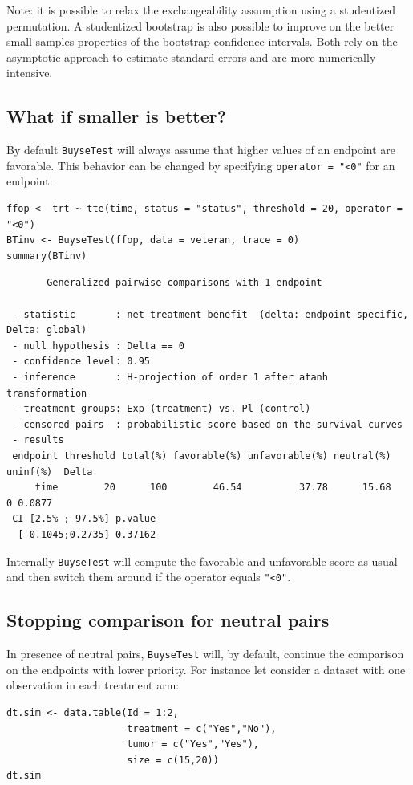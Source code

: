 \documentclass[12pt]{article}
\begin{document}
\bigskip

Note: it is possible to relax the exchangeability assumption using a
studentized permutation. A studentized bootstrap is also possible to
improve on the better small samples properties of the bootstrap
confidence intervals. Both rely on the asymptotic approach to estimate
standard errors and are more numerically intensive.

\clearpage

\subsection{What if smaller is better?}
\label{sec:org370f184}
By default \texttt{BuyseTest} will always assume that higher values of an
endpoint are favorable. This behavior can be changed by specifying \texttt{operator = "<0"}
for an endpoint:
\lstset{language=r,label= ,caption= ,captionpos=b,numbers=none}
\begin{lstlisting}
ffop <- trt ~ tte(time, status = "status", threshold = 20, operator = "<0")
BTinv <- BuyseTest(ffop, data = veteran, trace = 0)
summary(BTinv)
\end{lstlisting}

\begin{verbatim}
       Generalized pairwise comparisons with 1 endpoint

 - statistic       : net treatment benefit  (delta: endpoint specific, Delta: global) 
 - null hypothesis : Delta == 0 
 - confidence level: 0.95 
 - inference       : H-projection of order 1 after atanh transformation 
 - treatment groups: Exp (treatment) vs. Pl (control) 
 - censored pairs  : probabilistic score based on the survival curves
 - results
 endpoint threshold total(%) favorable(%) unfavorable(%) neutral(%) uninf(%)  Delta
     time        20      100        46.54          37.78      15.68        0 0.0877
 CI [2.5% ; 97.5%] p.value 
  [-0.1045;0.2735] 0.37162
\end{verbatim}

Internally \texttt{BuyseTest} will compute the favorable and unfavorable
score as usual and then switch them around if the operator equals
\texttt{"<0"}.

\clearpage

\subsection{Stopping comparison for neutral pairs}
\label{sec:org12083fa}
In presence of neutral pairs, \texttt{BuyseTest} will, by default, continue
the comparison on the endpoints with lower priority. For instance let
consider a dataset with one observation in each treatment arm:
\lstset{language=r,label= ,caption= ,captionpos=b,numbers=none}
\begin{lstlisting}
dt.sim <- data.table(Id = 1:2,
                     treatment = c("Yes","No"),
                     tumor = c("Yes","Yes"),
                     size = c(15,20))
dt.sim
\end{lstlisting}
\end{document}
